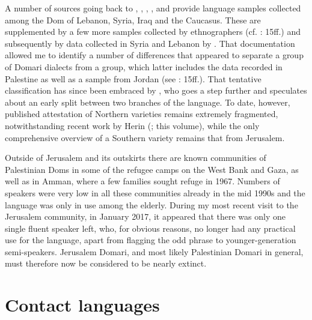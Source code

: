 \documentclass[output=paper]{langsci/langscibook}
\begin{document}
A number of sources going back to \citet{Pott1846}, \citet{Newbold1856}, \citet{Paspati1870}, \citet{Patkanoff1907}, and \citet{Black1913} provide language samples collected among the Dom of Lebanon, Syria, Iraq and the Caucasus. These are supplemented by a few more samples collected by ethnographers (cf. \citealt{Matras2012}: 15ff.) and subsequently by data collected in Syria and Lebanon by \citet{Herin2012}. That documentation allowed me to identify a number of differences that appeared to separate a  group of Domari dialects from a  group, which latter includes the data recorded in Palestine as well as a sample from Jordan (see \citealt{Matras2012}: 15ff.). That tentative classification has since been embraced by \citet{Herin2014Domari}, who goes a step further and speculates about an early split between two branches of the language. To date, however, published attestation of {Northern} varieties remains extremely fragmented, notwithstanding recent work by Herin (\citeyear{Herin2016}; this volume), while the only comprehensive overview of a {Southern} variety remains that from Jerusalem.

Outside of Jerusalem and its outskirts there are known communities of {Palestinian} Doms in some of the refugee camps on the West Bank and Gaza, as well as in Amman, where a few families sought refuge in 1967. Numbers of speakers were very low in all these communities already in the mid 1990s and the language was only in use among the elderly. During my most recent visit to the Jerusalem community, in  January 2017, it appeared that there was only one single fluent speaker left, who, for obvious reasons, no longer had any practical use for the language, apart from flagging the odd phrase to younger-generation semi-speakers. Jerusalem Domari, and most likely Palestinian Domari in general, must therefore now be considered to be nearly extinct.

\section{Contact languages
}\label{sec2}
\end{document}
